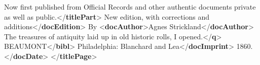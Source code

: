 \documentclass[11pt,twoside]{article}\makeatletter
\begin{document}
\begin{shaded}
Now first published from Official Records\mbox{}\newline 
\hspace*{6pt}\hspace*{6pt} and other authentic documents private as well as\mbox{}\newline 
\hspace*{6pt}\hspace*{6pt} public.{</\textbf{titlePart}>}\mbox{}\newline 
{}New edition, with corrections and\mbox{}\newline 
\hspace*{6pt}\hspace*{6pt} additions{</\textbf{docEdition}>}\mbox{}\newline 
{}By {<\textbf{docAuthor}>}Agnes Strickland{</\textbf{docAuthor}>}\mbox{}\newline 
{}\mbox{}\newline 
{}\mbox{}\newline 
\hspace*{6pt}The treasures of antiquity laid up in old\mbox{}\newline 
\hspace*{6pt}\hspace*{6pt}\hspace*{6pt}\hspace*{6pt} historic rolls, I opened.{</\textbf{q}>}\mbox{}\newline 
\hspace*{6pt}BEAUMONT{</\textbf{bibl}>}\mbox{}\newline 
{}\mbox{}\newline 
{}Philadelphia: Blanchard and Lea{</\textbf{docImprint}>}\mbox{}\newline 
{}1860.{</\textbf{docDate}>}\mbox{}\newline 
{</\textbf{titlePage}>}\end{shaded}\egroup\par 
\end{document}
